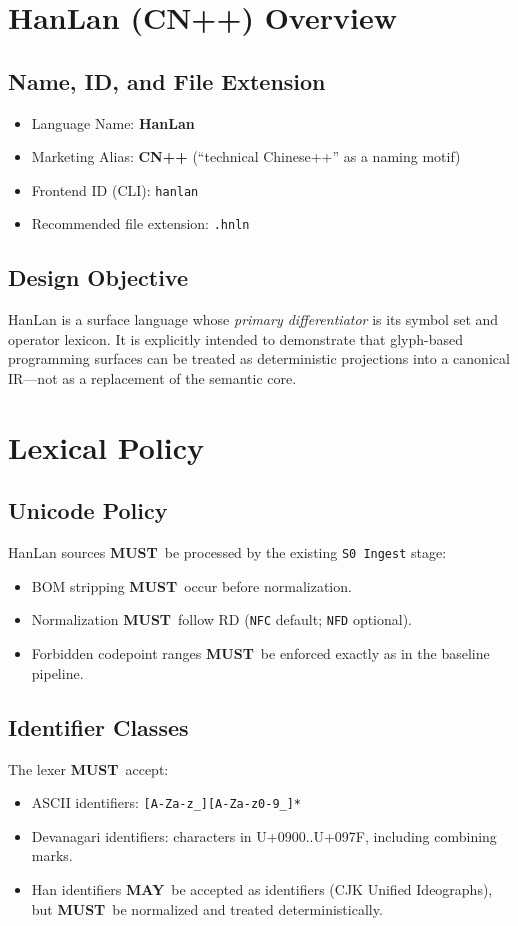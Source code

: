\documentclass[12pt]{article}
\newcommand{\MUST}{\textbf{MUST}}
\newcommand{\MAY}{\textbf{MAY}}
\begin{document}
\section{HanLan (CN++) Overview}
\subsection{Name, ID, and File Extension}
\begin{itemize}[leftmargin=1.5em]
  \item Language Name: \textbf{HanLan}
  \item Marketing Alias: \textbf{CN++} (``technical Chinese++'' as a naming motif)
  \item Frontend ID (CLI): \texttt{hanlan}
  \item Recommended file extension: \texttt{.hnln}
\end{itemize}

\subsection{Design Objective}
HanLan is a surface language whose \emph{primary differentiator} is its symbol set and operator
lexicon. It is explicitly intended to demonstrate that glyph-based programming surfaces can be
treated as deterministic projections into a canonical IR---not as a replacement of the semantic core.

\section{Lexical Policy}
\subsection{Unicode Policy}
HanLan sources \MUST\ be processed by the existing \texttt{S0 Ingest} stage:
\begin{itemize}[leftmargin=1.5em]
  \item BOM stripping \MUST\ occur before normalization.
  \item Normalization \MUST\ follow RD (\texttt{NFC} default; \texttt{NFD} optional).
  \item Forbidden codepoint ranges \MUST\ be enforced exactly as in the baseline pipeline.
\end{itemize}

\subsection{Identifier Classes}
The lexer \MUST\ accept:
\begin{itemize}[leftmargin=1.5em]
  \item ASCII identifiers: \texttt{[A-Za-z\_][A-Za-z0-9\_]*}
  \item Devanagari identifiers: characters in U+0900..U+097F, including combining marks.
  \item Han identifiers \MAY\ be accepted as identifiers (CJK Unified Ideographs), but \MUST\ be
        normalized and treated deterministically.
\end{itemize}
\end{document}
